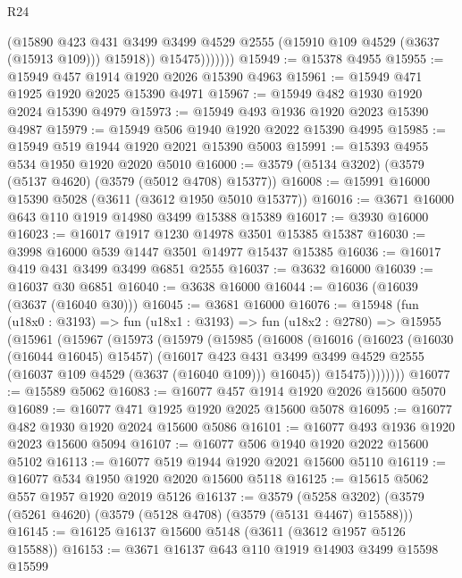 \begin{lexlean}{R24}
\begin{coremodule}
                    (@15890
                      @423
                      @431
                      @3499
                      @3499
                      @4529
                      @2555
                      (@15910 @109 @4529 (@3637 (@15913 @109)))
                      @15918))
                  @15475)))))))
@15949 := @15378 @4955
@15955 := @15949 @457 @1914 @1920 @2026 @15390 @4963
@15961 := @15949 @471 @1925 @1920 @2025 @15390 @4971
@15967 := @15949 @482 @1930 @1920 @2024 @15390 @4979
@15973 := @15949 @493 @1936 @1920 @2023 @15390 @4987
@15979 := @15949 @506 @1940 @1920 @2022 @15390 @4995
@15985 := @15949 @519 @1944 @1920 @2021 @15390 @5003
@15991 := @15393 @4955 @534 @1950 @1920 @2020 @5010
@16000 := @3579 (@5134 @3202) (@3579 (@5137 @4620) (@3579 (@5012 @4708) @15377))
@16008 := @15991 @16000 @15390 @5028 (@3611 (@3612 @1950 @5010 @15377))
@16016 := @3671 @16000 @643 @110 @1919 @14980 @3499 @15388 @15389
@16017 := @3930 @16000
@16023 := @16017 @1917 @1230 @14978 @3501 @15385 @15387
@16030 := @3998 @16000 @539 @1447 @3501 @14977 @15437 @15385
@16036 := @16017 @419 @431 @3499 @3499 @6851 @2555
@16037 := @3632 @16000
@16039 := @16037 @30 @6851
@16040 := @3638 @16000
@16044 := @16036 (@16039 (@3637 (@16040 @30)))
@16045 := @3681 @16000
@16076 := @15948
    (fun (u18x0 : @3193) =>
    fun (u18x1 : @3193) =>
    fun (u18x2 : @2780) =>
    @15955
      (@15961
        (@15967
          (@15973
            (@15979
              (@15985
                (@16008
                  (@16016
                    (@16023
                      (@16030 (@16044 @16045) @15457)
                      (@16017
                        @423
                        @431
                        @3499
                        @3499
                        @4529
                        @2555
                        (@16037 @109 @4529 (@3637 (@16040 @109)))
                        @16045))
                    @15475))))))))
@16077 := @15589 @5062
@16083 := @16077 @457 @1914 @1920 @2026 @15600 @5070
@16089 := @16077 @471 @1925 @1920 @2025 @15600 @5078
@16095 := @16077 @482 @1930 @1920 @2024 @15600 @5086
@16101 := @16077 @493 @1936 @1920 @2023 @15600 @5094
@16107 := @16077 @506 @1940 @1920 @2022 @15600 @5102
@16113 := @16077 @519 @1944 @1920 @2021 @15600 @5110
@16119 := @16077 @534 @1950 @1920 @2020 @15600 @5118
@16125 := @15615 @5062 @557 @1957 @1920 @2019 @5126
@16137 := @3579
    (@5258 @3202)
    (@3579 (@5261 @4620) (@3579 (@5128 @4708) (@3579 (@5131 @4467) @15588)))
@16145 := @16125 @16137 @15600 @5148 (@3611 (@3612 @1957 @5126 @15588))
@16153 := @3671 @16137 @643 @110 @1919 @14903 @3499 @15598 @15599

\end{coremodule}
\end{lexlean}
